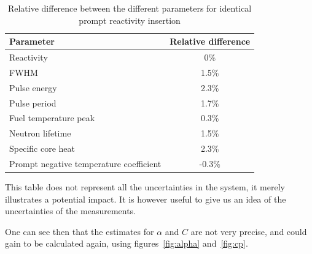 \begin{table}[!htb]
    \centering
\begin{tabular}{p{6cm}c}
Parameter & Relative difference \\ \hline\hline
Reactivity & 0\% \\
FWHM & 1.5\% \\
Pulse energy & 2.3\% \\
Pulse period & 1.7\% \\
Fuel temperature peak & 0.3\% \\
\hline
Neutron lifetime & 1.5\% \\
Specific core heat & 2.3\% \\
Prompt negative temperature coefficient & -0.3\%
\end{tabular}
        \caption{Relative difference between the different parameters for identical prompt reactivity insertion}\label{tab:comp}
\end{table}

This table does not represent all the uncertainties in the system, it merely illustrates a potential impact. It is however useful to give us an idea of the uncertainties of the measurements.

One can see then that the estimates for $\alpha$ and $C$ are not very precise, and could gain to be calculated again, using figures~\ref{fig:alpha} and~\ref{fig:cp}.
